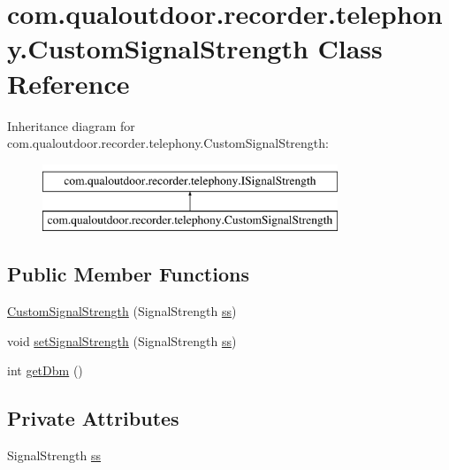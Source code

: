 \hypertarget{classcom_1_1qualoutdoor_1_1recorder_1_1telephony_1_1CustomSignalStrength}{\section{com.\-qualoutdoor.\-recorder.\-telephony.\-Custom\-Signal\-Strength Class Reference}
\label{classcom_1_1qualoutdoor_1_1recorder_1_1telephony_1_1CustomSignalStrength}
}
Inheritance diagram for com.\-qualoutdoor.\-recorder.\-telephony.\-Custom\-Signal\-Strength\-:\begin{figure}[H]
\begin{center}
\leavevmode
\includegraphics[height=2.000000cm]{classcom_1_1qualoutdoor_1_1recorder_1_1telephony_1_1CustomSignalStrength}
\end{center}
\end{figure}
\subsection*{Public Member Functions}
\begin{DoxyCompactItemize}
\item 
\hyperlink{classcom_1_1qualoutdoor_1_1recorder_1_1telephony_1_1CustomSignalStrength_aef90e4b781dd2f33444bf109b700a618}{Custom\-Signal\-Strength} (Signal\-Strength \hyperlink{classcom_1_1qualoutdoor_1_1recorder_1_1telephony_1_1CustomSignalStrength_aa3981bd9454f9a027a9b2f6697da62e3}{ss})
\item 
void \hyperlink{classcom_1_1qualoutdoor_1_1recorder_1_1telephony_1_1CustomSignalStrength_aef4df56064e24b3442dcb80ec1099b06}{set\-Signal\-Strength} (Signal\-Strength \hyperlink{classcom_1_1qualoutdoor_1_1recorder_1_1telephony_1_1CustomSignalStrength_aa3981bd9454f9a027a9b2f6697da62e3}{ss})
\item 
int \hyperlink{classcom_1_1qualoutdoor_1_1recorder_1_1telephony_1_1CustomSignalStrength_ad36ba58128637b99f41756dfccfe508f}{get\-Dbm} ()
\end{DoxyCompactItemize}
\subsection*{Private Attributes}
\begin{DoxyCompactItemize}
\item 
Signal\-Strength \hyperlink{classcom_1_1qualoutdoor_1_1recorder_1_1telephony_1_1CustomSignalStrength_aa3981bd9454f9a027a9b2f6697da62e3}{ss}
\end{DoxyCompactItemize}


